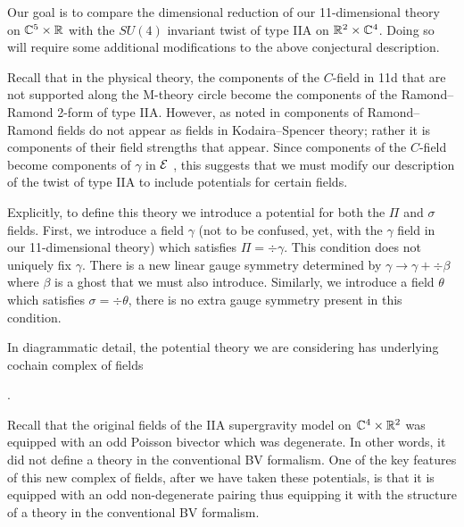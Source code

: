 Our goal is to compare the dimensional reduction of our 11-dimensional theory on $\mathbb C^5 \times \mathbb R$
with the $SU(4)$ invariant twist of type IIA on $\mathbb{R}^{2}\times \mathbb C^4$. 
Doing so will require some additional modifications to the above conjectural description. 

Recall that in the physical theory, the components of the $C$-field in 11d that are not supported along the M-theory circle become the components of the Ramond--Ramond 2-form of type IIA. However, as noted in \cite{CLSugra} components of Ramond--Ramond fields do not appear as fields in Kodaira--Spencer theory; rather it is components of their field strengths that appear. Since components of the $C$-field become components of $\gamma$ in $\mathcal E$ , this suggests that we must modify our description of the twist of type IIA to include potentials for certain fields.

Explicitly, to define this theory we introduce a potential for both the $\Pi$ and $\sigma$ fields. 
First, we introduce a field $\gamma$ (not to be confused, yet, with the $\gamma$ field in our 11-dimensional theory) which satisfies $\Pi = \div \gamma$.
This condition does not uniquely fix $\gamma$. 
There is a new linear gauge symmetry determined by $\gamma \to \gamma + \div \beta$ where $\beta$ is a ghost that we must also introduce. 
Similarly, we introduce a field $\theta$ which satisfies $\sigma = \div \theta$, there is no extra gauge symmetry present in this condition. 

In diagrammatic detail, the potential theory we are considering has underlying cochain complex of fields
\beqn\label{eqn:IIApot}
\eeqn.

Recall that the original fields of the IIA supergravity model on $\mathbb C^4 \times \mathbb R^2$ was equipped with an odd Poisson bivector which was degenerate.
In other words, it did not define a theory in the conventional BV formalism. 
One of the key features of this new complex of fields, after we have taken these potentials, is that it is equipped with an odd non-degenerate pairing thus equipping it with the structure of a theory in the conventional BV formalism. 

